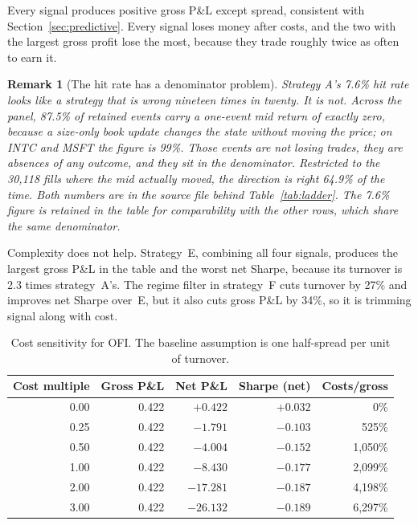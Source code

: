 \documentclass[11pt]{scrartcl}
\newtheorem{remark}{Remark}[section]
\begin{document}
Every signal produces positive gross P\&L except spread, consistent with Section~\ref{sec:predictive}. Every signal loses money after costs, and the two with the largest gross profit lose the most, because they trade roughly twice as often to earn it.

\begin{remark}[The hit rate has a denominator problem]
\label{rem:hitrate}
Strategy A's 7.6\% hit rate looks like a strategy that is wrong nineteen times in twenty. It is not. Across the panel, 87.5\% of retained events carry a one-event mid return of \emph{exactly zero}, because a size-only book update changes the state without moving the price; on INTC and MSFT the figure is 99\%. Those events are not losing trades, they are absences of any outcome, and they sit in the denominator. Restricted to the 30{,}118 fills where the mid actually moved, the direction is right 64.9\% of the time. Both numbers are in the source file behind Table~\ref{tab:ladder}. The 7.6\% figure is retained in the table for comparability with the other rows, which share the same denominator.
\end{remark}

Complexity does not help. Strategy~E, combining all four signals, produces the largest gross P\&L in the table and the worst net Sharpe, because its turnover is 2.3 times strategy~A's. The regime filter in strategy~F cuts turnover by 27\% and improves net Sharpe over~E, but it also cuts gross P\&L by 34\%, so it is trimming signal along with cost.

\begin{table}[H]
\centering
\caption{Cost sensitivity for OFI. The baseline assumption is one half-spread per unit of turnover.}
\label{tab:costs}
\begin{tabular}{rrrrr}
\toprule
Cost multiple & Gross P\&L & Net P\&L & Sharpe (net) & Costs/gross \\
\midrule
0.00 & 0.422 & $\mathbf{+0.422}$ & $+0.032$ & 0\% \\
0.25 & 0.422 & $-1.791$  & $-0.103$ & 525\% \\
0.50 & 0.422 & $-4.004$  & $-0.152$ & 1{,}050\% \\
1.00 & 0.422 & $-8.430$  & $-0.177$ & 2{,}099\% \\
2.00 & 0.422 & $-17.281$ & $-0.187$ & 4{,}198\% \\
3.00 & 0.422 & $-26.132$ & $-0.189$ & 6{,}297\% \\
\bottomrule
\end{tabular}
\end{table}
\end{document}
